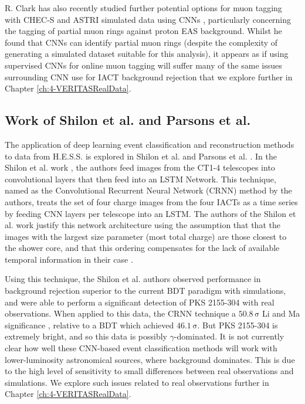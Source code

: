 R. Clark has also recently studied further potential options for muon tagging with CHEC-S and ASTRI simulated data using CNNs \cite{roganthesis}, particularly concerning the tagging of partial muon rings against proton EAS background. Whilst he found that CNNs can identify partial muon rings (despite the complexity of generating a simulated dataset suitable for this analysis), it appears as if using supervised CNNs for online muon tagging will suffer many of the same issues surrounding CNN use for IACT background rejection that we explore further in Chapter \ref{ch:4-VERITASRealData}.

\subsection{Work of Shilon et al. and Parsons et al.}
The application of deep learning event classification and reconstruction methods to data from H.E.S.S. is explored in Shilon et al. \cite{Shilon} and Parsons et al. \cite{ParsonsOhm}. In the Shilon et al. work \cite{Shilon}, the authors feed images from the CT1-4 telescopes into convolutional layers that then feed into an LSTM Network. This technique, named as the Convolutional Recurrent Neural Network (CRNN) method by the authors, treats the set of four charge images from the four IACTs as a time series by feeding CNN layers per telescope into an LSTM. The authors of the Shilon et al. work justify this network architecture using the assumption that that the images with the largest size parameter (most total charge) are those closest to the shower core, and that this ordering compensates for the lack of available temporal information in their case \cite{Shilon}.

Using this technique, the Shilon et al. authors observed performance in background rejection superior to the current BDT paradigm with simulations, and were able to perform a significant detection of PKS 2155-304 with real observations. When applied to this data, the CRNN technique a $\mathrm{50.8\,\sigma}$ Li and Ma significance \cite{LiMa}, relative to a BDT which achieved $\mathrm{46.1\,\sigma}$. But PKS 2155-304 is extremely bright, and so this data is possibly $\gamma$-dominated. It is not currently clear how well these CNN-based event classification methods will work with lower-luminosity astronomical sources, where background dominates. This is due to the high level of sensitivity to small differences between real observations and simulations. We explore such issues related to real observations further in Chapter \ref{ch:4-VERITASRealData}.

